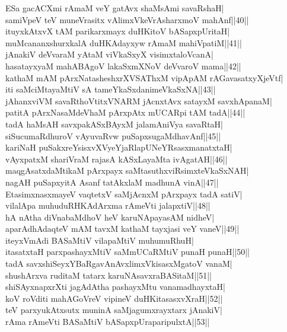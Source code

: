 \documentclass{article}
\begin{document}
ESa gacACXmi rAmaM veY gatAvx shaMsAmi savaRshaH|\\
samiVpeV teV muneVrasitx vAlimxVkeVrAsharxmoV mahAnf||40||\\
ituyxkAtxvX tAM parikarxmayx duHKitoV bASapxpUritaH|\\
muMcananxshurxkalA duHKAdayxyw rAmaM mahiVpatiM||41||\\
jAnakiV deVvaraM yAtaM viVkaSxyX visimxtaloVcanA|\\
hasatayxyaM mahABAgoV lakaSxmXNoV deVvaroV mama||42||\\
kathaM mAM pArxNatasheshxrXVSAThxM vipApAM rAGavasatxyXjeVtf|\\
iti saMciMtayaMtiV sA tameYkaSxdanimeVkaSxNA||43||\\
jAhanxviVM savaRthoVtitxVNARM jAcnxtAvx satayxM savxhApanaM|\\
patitA pArxNasaMdeVhaM pArxpAtx mUCARpi tAM tadA||44||\\
tadA haMsAH savxpakASxBAyxM jalamAniVya savaRtaH|\\
siSucumaRdhuroV vAyuvaRvw puSapxsugaMdhavAnf||45||\\
kariNaH puSakxreYsisxvXVyeYjaRlapUNeYRsasxmanatxtaH|\\
vAyxpatxM shariVraM rajasA kASxLayaMta ivAgatAH||46||\\
maqgAsatxdaMtikaM pArxpayx saMtasuthxviRsimxteVkaSxNAH|\\
nagAH puSapxyitA Asanf tatAkxlaM madhunA vinA||47||\\
EtasimxnasxmayeV vaqtetxV saMjAcnxM pArxpayx tadA satiV|\\
vilalApa muhuduRHKAdArxma rAmeVti jalapxtiV||48||\\
hA nAtha diVnabaMdhoV heV karuNApayasAM nidheV|\\
aparAdhAdaqteV mAM tavxM kathaM tayxjasi veY vaneV||49||\\
iteyxVmAdi BASaMtiV vilapaMtiV muhumuRhuH|\\
itasatxtaH parxpashayxMtiV saMmUCaRMtiV punaH punaH||50||\\
tadA savxshiSeyxYBaRgavAnAvxlimxVkisasxMgatoV vanaM|\\
shushArxva ruditaM tatarx karuNAsavxraBASitaM||51||\\
shiSAyxnapxrXti jagAdAtha pashayxMtu vanamadhayxtaH|\\
koV roVditi mahAGoVreV vipineV duHKitasasxvXraH||52||\\
teV parxyukAtxsutx muninA saMjagumxrayxtarx jAnakiV|\\
rAma rAmeVti BASaMtiV bASapxpUraparipulxtA||53||\\
\end{document}
